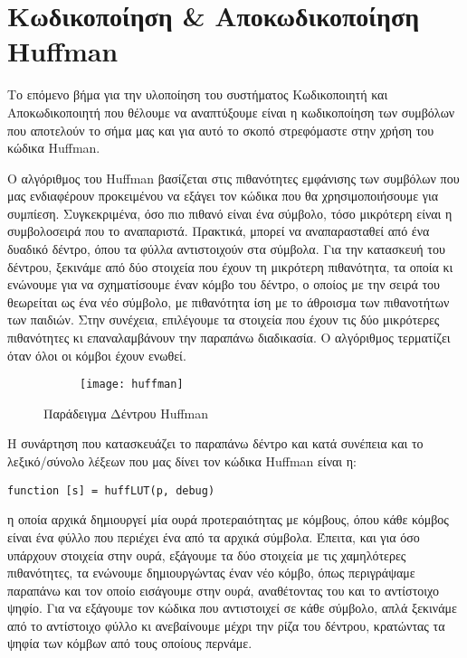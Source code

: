 \section{Κωδικοποίηση \& Αποκωδικοποίηση Huffman}



\noindent
\begin{minipage}{\linewidth}
\par Το επόμενο βήμα για την υλοποίηση του συστήματος Κωδικοποιητή και Αποκωδικοποιητή που θέλουμε να
αναπτύξουμε είναι η κωδικοποίηση των συμβόλων που αποτελούν το σήμα μας και για αυτό το σκοπό
στρεφόμαστε στην χρήση του κώδικα Huffman.

  \par Ο αλγόριθμος του Huffman βασίζεται στις πιθανότητες εμφάνισης των συμβόλων που μας ενδιαφέρουν
  προκειμένου να εξάγει τον κώδικα που θα χρησιμοποιήσουμε για συμπίεση. Συγκεκριμένα, όσο πιο πιθανό
  είναι ένα σύμβολο, τόσο μικρότερη είναι η συμβολοσειρά που το αναπαριστά. Πρακτικά, μπορεί να
  αναπαρασταθεί από ένα δυαδικό δέντρο, όπου τα φύλλα αντιστοιχούν στα σύμβολα. Για την κατασκευή του
  δέντρου, ξεκινάμε από δύο στοιχεία που έχουν τη μικρότερη πιθανότητα, τα οποία κι ενώνουμε για να
  σχηματίσουμε έναν κόμβο του δέντρο, ο οποίος με την σειρά του θεωρείται ως ένα νέο σύμβολο, με
  πιθανότητα ίση με το άθροισμα των πιθανοτήτων των παιδιών. Στην συνέχεια, επιλέγουμε τα στοιχεία που
  έχουν τις δύο μικρότερες πιθανότητες κι επαναλαμβάνουν την παραπάνω διαδικασία. Ο αλγόριθμος
  τερματίζει όταν όλοι οι κόμβοι έχουν ενωθεί.
  \begin{framed}
    \begin{figure}[H]
      \label{fig:huffman}
      \centering
      \begin{subfigure}{1.0\textwidth}
        \centering
        \texttt{[image: huffman]}
        \caption{}
      \end{subfigure}
      \caption{Παράδειγμα Δέντρου Huffman}
    \end{figure}
  \end{framed}
\end{minipage}

\par Η συνάρτηση που κατασκευάζει το παραπάνω δέντρο και κατά συνέπεια και το λεξικό/σύνολο λέξεων
που μας δίνει τον κώδικα Huffman είναι η:
\begin{lstlisting}[style=myMatlab]
  function [s] = huffLUT(p, debug)
\end{lstlisting}
\noindent η οποία αρχικά δημιουργεί μία ουρά προτεραιότητας με κόμβους, όπου κάθε κόμβος είναι ένα
φύλλο που περιέχει ένα από τα αρχικά σύμβολα. Έπειτα, και για όσο υπάρχουν στοιχεία στην ουρά,
εξάγουμε τα δύο στοιχεία με τις χαμηλότερες πιθανότητες, τα ενώνουμε δημιουργώντας έναν νέο κόμβο,
όπως περιγράψαμε παραπάνω και τον οποίο εισάγουμε στην ουρά, αναθέτοντας του και το αντίστοιχο
ψηφίο. Για να εξάγουμε τον κώδικα που αντιστοιχεί σε κάθε σύμβολο, απλά ξεκινάμε από το αντίστοιχο
φύλλο κι ανεβαίνουμε μέχρι την ρίζα του δέντρου, κρατώντας τα ψηφία των κόμβων από τους οποίους
περνάμε.


